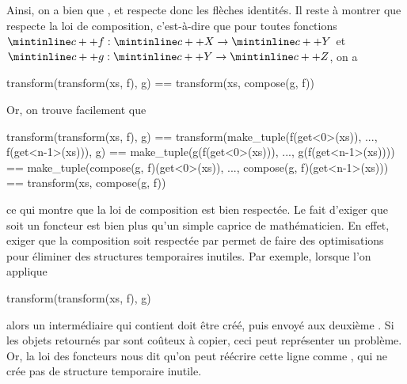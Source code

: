 Ainsi, on a bien que , et  respecte
donc les flèches identités. Il reste à montrer que  respecte la
loi de composition, c'est-à-dire que pour toutes fonctions
$\cc{f} : \cc{X} \to \cc{Y}$ et $\cc{g} : \cc{Y} \to \cc{Z}$, on a
\begin{cpp}
    transform(transform(xs, f), g) == transform(xs, compose(g, f))
\end{cpp}

Or, on trouve facilement que
\begin{cpp}
    transform(transform(xs, f), g)
        == transform(make_tuple(f(get<0>(xs)), ..., f(get<n-1>(xs))), g)
        == make_tuple(g(f(get<0>(xs))), ..., g(f(get<n-1>(xs))))
        == make_tuple(compose(g, f)(get<0>(xs)), ..., compose(g, f)(get<n-1>(xs)))
        == transform(xs, compose(g, f))
\end{cpp}

ce qui montre que la loi de composition est bien respectée. Le fait d'exiger
que  soit un foncteur est bien plus qu'un simple caprice de
mathématicien. En effet, exiger que la composition soit respectée par
 permet de faire des optimisations pour éliminer des
structures temporaires inutiles. Par exemple, lorsque l'on applique
\begin{cpp}
    transform(transform(xs, f), g)
\end{cpp}

alors un  intermédiaire qui contient  doit
être créé, puis envoyé aux deuxième . Si les objets retournés
par  sont coûteux à copier, ceci peut représenter un problème. Or, la
loi des foncteurs nous dit qu'on peut réécrire cette ligne comme
, qui ne crée pas de structure
temporaire inutile.
